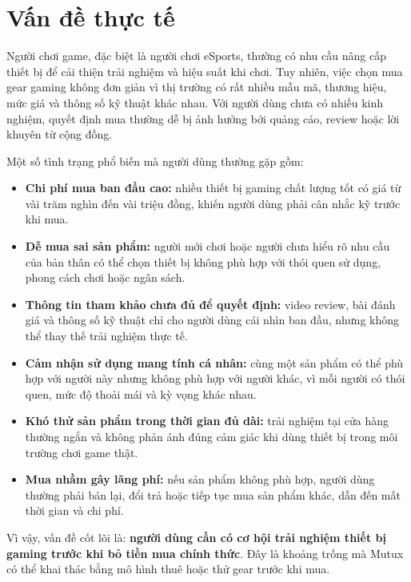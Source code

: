 \section{Vấn đề thực tế}

Người chơi game, đặc biệt là người chơi eSports, thường có nhu cầu nâng cấp thiết bị để cải thiện trải nghiệm và hiệu suất khi chơi. Tuy nhiên, việc chọn mua gear gaming không đơn giản vì thị trường có rất nhiều mẫu mã, thương hiệu, mức giá và thông số kỹ thuật khác nhau. Với người dùng chưa có nhiều kinh nghiệm, quyết định mua thường dễ bị ảnh hưởng bởi quảng cáo, review hoặc lời khuyên từ cộng đồng.

Một số tình trạng phổ biến mà người dùng thường gặp gồm:

\begin{itemize}
    \item \textbf{Chi phí mua ban đầu cao:} nhiều thiết bị gaming chất lượng tốt có giá từ vài trăm nghìn đến vài triệu đồng, khiến người dùng phải cân nhắc kỹ trước khi mua.
    \item \textbf{Dễ mua sai sản phẩm:} người mới chơi hoặc người chưa hiểu rõ nhu cầu của bản thân có thể chọn thiết bị không phù hợp với thói quen sử dụng, phong cách chơi hoặc ngân sách.
    \item \textbf{Thông tin tham khảo chưa đủ để quyết định:} video review, bài đánh giá và thông số kỹ thuật chỉ cho người dùng cái nhìn ban đầu, nhưng không thể thay thế trải nghiệm thực tế.
    \item \textbf{Cảm nhận sử dụng mang tính cá nhân:} cùng một sản phẩm có thể phù hợp với người này nhưng không phù hợp với người khác, vì mỗi người có thói quen, mức độ thoải mái và kỳ vọng khác nhau.
    \item \textbf{Khó thử sản phẩm trong thời gian đủ dài:} trải nghiệm tại cửa hàng thường ngắn và không phản ánh đúng cảm giác khi dùng thiết bị trong môi trường chơi game thật.
    \item \textbf{Mua nhầm gây lãng phí:} nếu sản phẩm không phù hợp, người dùng thường phải bán lại, đổi trả hoặc tiếp tục mua sản phẩm khác, dẫn đến mất thời gian và chi phí.
\end{itemize}

Vì vậy, vấn đề cốt lõi là: \textbf{người dùng cần có cơ hội trải nghiệm thiết bị gaming trước khi bỏ tiền mua chính thức}. Đây là khoảng trống mà Mutux có thể khai thác bằng mô hình thuê hoặc thử gear trước khi mua.
